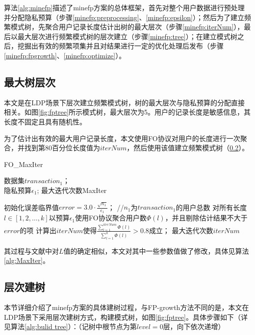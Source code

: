 \documentclass[UTF8]{ctexart}
\begin{document}

算法\ref{alg:minefp}描述了minefp方案的总体框架，首先对整个用户数据进行预处理并分配隐私预算（步骤\ref{minefp:preprocessing}、\ref{minefp:epsilon}）；然后为了建立频繁模式树，先聚合用户记录长度估计出树的最大层次（步骤\ref{minefp:iterNum}），最后以最大层次进行频繁模式树的层次建立（步骤\ref{minefp:tree}）；在建立模式树之后，挖掘出有效的频繁项集并且对结果进行一定的优化处理后发布（步骤\ref{minefp:fpgrowth}、\ref{minefp:optimize}）。


\subsection{最大树层次}
\label{section:MaxIter}
本文是在LDP场景下层次建立频繁模式树，树的最大层次与隐私预算的分配直接相关。如图\ref{fig:fptree}所示模式树，最大层次为5。用户的记录长度是敏感信息，其长度不固定且具有随机性。

为了估计出有效的最大用户记录长度，本文使用FO协议对用户的长度进行一次聚合，并找到第80百分位长度值为$iterNum$，然后使用该值建立频繁模式树（\ref{section:buildTree}）。

\begin{algorithm}[ht]
\caption{FO\_MaxIter}
\label{alg:MaxIter}
\begin{algorithmic}[1]
\REQUIRE 数据集$transaction_1$；\\
隐私预算$\epsilon_1$;
\ENSURE 最大迭代次数MaxIter

\STATE 初始化误差临界值$error = 3.0 \cdot \frac{\sqrt{n_1}}{\epsilon_1}$； //$n_1$为$transaction_1$的用户总数
\label{T threshold}
\STATE 对所有长度$l \in [1,2,\ldots,k]$以预算$\epsilon_1$使用FO协议聚合用户数$\Phi(l)$，并且剔除估计结果不大于$error$的项
\STATE 计算出$iterNum$使得$\frac{ \sum_{l=1}^{iterNum} \Phi(l)}{\sum_{l=1}^k \Phi(l)} > 0.8$成立；
\label{gamma=0.8}
\RETURN 最大迭代次数$iterNum$
\end{algorithmic}
\end{algorithm}

其过程与文献\cite{wang2018locally}中对$L$值的确定相似，本文对其中一些参数值做了修改，具体见算法\ref{alg:MaxIter}。

\subsection{层次建树}
\label{section:buildTree}
  本节详细介绍了minefp方案的具体建树过程，与FP-growth方法不同的是，本文在LDP场景下采用层次建树方式，构建模式树，如图\ref{fig:fptree}。具体步骤如下（详见算法\ref{alg:bulid tree}）：（记树中根节点为第$level = 0$层，向下依次递增）
\end{document}
